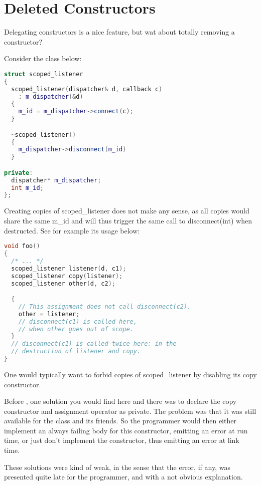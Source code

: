 \section{Deleted Constructors}

Delegating constructors is a nice feature, but wat about totally
removing a constructor?

Consider the class below:

\begin{lstlisting}[language=c++]
struct scoped_listener
{
  scoped_listener(dispatcher& d, callback c)
    : m_dispatcher(&d)
  {
    m_id = m_dispatcher->connect(c);
  }

  ~scoped_listener()
  {
    m_dispatcher->disconnect(m_id)
  }

private:
  dispatcher* m_dispatcher;
  int m_id;
};
\end{lstlisting}

Creating copies of scoped\_listener does not make any sense, as all
copies would share the same m\_id and will thus trigger the same call
to disconnect(int) when destructed. See for example its usage below:

\begin{lstlisting}[language=c++]
void foo()
{
  /* ... */
  scoped_listener listener(d, c1);
  scoped_listener copy(listener);
  scoped_listener other(d, c2);

  {
    // This assignment does not call disconnect(c2).
    other = listener;
    // disconnect(c1) is called here,
    // when other goes out of scope.
  }
  // disconnect(c1) is called twice here: in the
  // destruction of listener and copy.
}
\end{lstlisting}

One would typically want to forbid copies of scoped\_listener by
disabling its copy constructor.

Before , one solution you would find here and there was to
declare the copy constructor and assignment operator as private. The
problem was that it was still available for the class and its
friends. So the programmer would then either implement an always
failing body for this constructor, emitting an error at run time, or
just don't implement the constructor, thus emitting an error at link
time.

These solutions were kind of weak, in the sense that the error, if
any, was presented quite late for the programmer, and with a not
obvious explanation.

